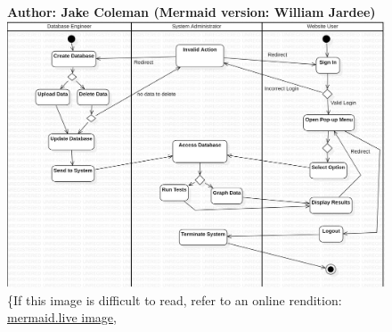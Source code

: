 \documentclass[11pt]{article}
\begin{document}
\begin{figure}[!ht]
\centering
\textbf{Author: Jake Coleman (Mermaid version: William Jardee)}
	\includegraphics[width=.95\textwidth]{./Activity Diagram/activitydiagram2}\\
	\{If this image is difficult to read, refer to an online rendition: \href{https://mermaid.ink/img/pako:eNp9lW1r2zAQx7-K0cuRpLWdB8eUQlnLGGx0tCuDLSMo8sUWs2Vjyd2ykO--04Mjt0mXN5Hudzrdnf8-7wmrMyApkYoquOU0b2k1fo5WIsAfiDwNbqmiGyohuBM5FwCtZXIn1zQL0uBxJxVUwU1WccGlaqmqnctv2Kw7CS06fYON5AqCJ9mfZ-06owrR-xbw6uM1lnaNo09NWeM1mlqSQenQLZTgDg4P2WT1yew0rgRhctZ_qna5W8TFMy25ph_d6oYpXgtLKWMmOOIbxkDKV4HbtQKps3roRPAVl9Lac5fsh5Y2xSBXBS32CxNM0dstX6Qj11xgojwXmI81VSA6DHXfgAi-1M24a4ypr6wEpkxtZnHf-OQ_1XndqZXbmUdtyw2urlhRcwbX10Ome8wKYL_e4Fxg-hQvOY8rKkzVQ2r50AvFtbd7_fvx7ud4fO1U4c1OJRq5qJ7112hoH_155hTjYS-hHppSX2JbvY88eNKnLk45Hg-FqB2M6jzWW23uNWXJ4ehg-9O_PYMmZVw2Jd1p7bvVA8iu7LXm-mivRPl4a6_tU6J3vohXJ85X55FX31GetlytwGG9RpGnJQ9r-k-8Xr49sHuDjq-Rp0eTccB-9OI7DNVnx9f-pEXecJrqmcuOY8F2yr0Ww6jOpLmdEW_A_KVG3TwxErUd8iz36h0iXR8ZkQqzpDzDmW6qWxFVQAUrkuIygy1FvazIShzQtTMj8i7jOLJJuqWlhBGhnaofd4KRVLUd9E7u03D00lMZ8NCeqF2jPyA5zn4MyWqx5bm2d22J5kKpRqYXFxpPcq6KbjNhdXUheVbQVhXPy_nFPJonNIphvojpLI4ztgmXyTaahttscRlGlBwOI9JQoaP-IWmcRJNkeRnOF1E8j6MkHJEdScezSRjNZtMonMfJNEkWCzz0t64x5XByGU5ny-VsGSWzCG-ITbjvBtoiwfTgs_0Wmk_i4R9q0ioj?type=png)](https://mermaid.live/edit#pako:eNp9lW1r2zAQx7-K0cuRpLWdB8eUQlnLGGx0tCuDLSMo8sUWs2Vjyd2ykO--04Mjt0mXN5Hudzrdnf8-7wmrMyApkYoquOU0b2k1fo5WIsAfiDwNbqmiGyohuBM5FwCtZXIn1zQL0uBxJxVUwU1WccGlaqmqnctv2Kw7CS06fYON5AqCJ9mfZ-06owrR-xbw6uM1lnaNo09NWeM1mlqSQenQLZTgDg4P2WT1yew0rgRhctZ_qna5W8TFMy25ph_d6oYpXgtLKWMmOOIbxkDKV4HbtQKps3roRPAVl9Lac5fsh5Y2xSBXBS32CxNM0dstX6Qj11xgojwXmI81VSA6DHXfgAi-1M24a4ypr6wEpkxtZnHf-OQ_1XndqZXbmUdtyw2urlhRcwbX10Ome8wKYL_e4Fxg-hQvOY8rKkzVQ2r50AvFtbd7_fvx7ud4fO1U4c1OJRq5qJ7112hoH_155hTjYS-hHppSX2JbvY88eNKnLk45Hg-FqB2M6jzWW23uNWXJ4ehg-9O_PYMmZVw2Jd1p7bvVA8iu7LXm-mivRPl4a6_tU6J3vohXJ85X55FX31GetlytwGG9RpGnJQ9r-k-8Xr49sHuDjq-Rp0eTccB-9OI7DNVnx9f-pEXecJrqmcuOY8F2yr0Ww6jOpLmdEW_A_KVG3TwxErUd8iz36h0iXR8ZkQqzpDzDmW6qWxFVQAUrkuIygy1FvazIShzQtTMj8i7jOLJJuqWlhBGhnaofd4KRVLUd9E7u03D00lMZ8NCeqF2jPyA5zn4MyWqx5bm2d22J5kKpRqYXFxpPcq6KbjNhdXUheVbQVhXPy_nFPJonNIphvojpLI4ztgmXyTaahttscRlGlBwOI9JQoaP-IWmcRJNkeRnOF1E8j6MkHJEdScezSRjNZtMonMfJNEkWCzz0t64x5XByGU5ny-VsGSWzCG-ITbjvBtoiwfTgs_0Wmk_i4R9q0ioj}{mermaid.live image}, 

\end{figure}
\end{document}
